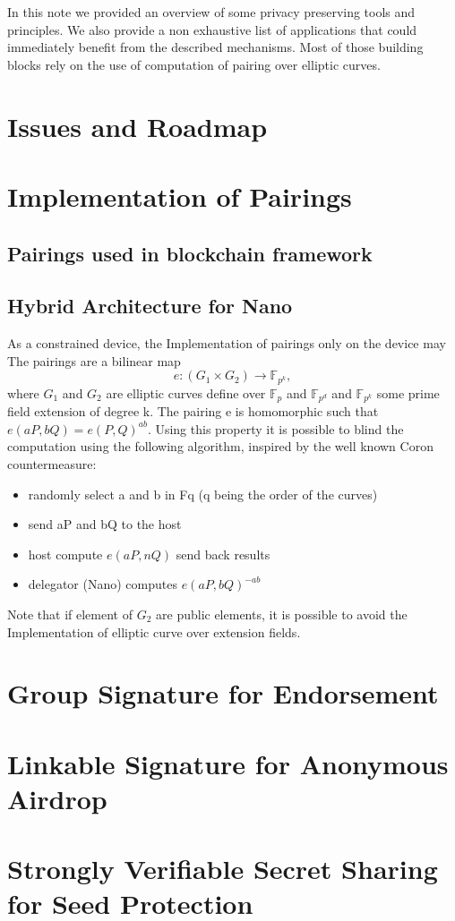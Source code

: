 \documentclass[11pt]{llncs2e/llncs}
\begin{document}
In this note we provided an overview of some privacy preserving tools and principles. We also provide a non exhaustive list of applications that could immediately benefit from the described mechanisms. Most of those building blocks rely on the use of computation of pairing over elliptic curves. 







\appendix

\section{Issues and Roadmap}



\section{Implementation of Pairings}



\subsection{Pairings used in blockchain framework}


\subsection{Hybrid Architecture for Nano}
As a constrained device, the Implementation of pairings only on the device may 
The pairings are a bilinear map $$e:(G_1 \times G_2) \rightarrow \mathbb{F}_{p^k}, $$ where $G_1$ and $G_2$ are elliptic curves define over $\mathbb{F}_p$ and $\mathbb{F}_{p^d}$ and $\mathbb{F}_{p^k}$ some prime field extension of degree k. The pairing e is homomorphic such that $e(aP, bQ)=e(P,Q)^{ab}$. Using this property it is possible to blind the computation using the following algorithm, inspired by the well known Coron countermeasure:
\begin{itemize}
 \item randomly select a and b in Fq (q being the order of the curves)
 \item send aP and bQ to the host
\item host compute $e(aP,nQ)$ send back results
\item delegator (Nano) computes $e(aP, bQ)^{-ab}$
\end{itemize}
Note that if element of $G_2$ are public elements, it is possible to avoid the Implementation of elliptic curve over extension fields.

\section{Group Signature for Endorsement}


\section{Linkable Signature for Anonymous Airdrop}

\section{Strongly Verifiable Secret Sharing for Seed Protection}
\end{document}
